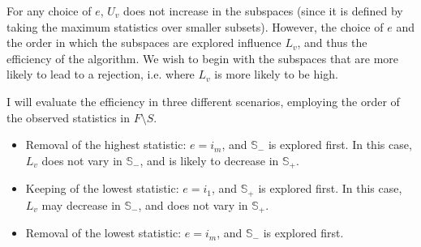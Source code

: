\documentclass[11pt,a4paper,openright,twoside]{article}
\begin{document}
For any choice of $e$, $U_v$ does not increase in the subspaces (since it is defined by taking the maximum statistics over smaller subsets). However, the choice of $e$ and the order in which the subspaces are explored influence $L_v$, and thus the efficiency of the algorithm. We wish to begin with the subspaces that are more likely to lead to a rejection, i.e. where $L_v$ is more likely to be high.

I will evaluate the efficiency in three different scenarios, employing the order of the observed statistics in $F\setminus S$.
\begin{itemize}
\item Removal of the highest statistic: $e=i_m$, and $\mathbb{S}_{-}$ is explored first. In this case, $L_v$ does not vary in $\mathbb{S}_{-}$, and is likely to decrease in $\mathbb{S}_{+}$.
\item Keeping of the lowest statistic: $e=i_1$, and $\mathbb{S}_{+}$ is explored first. In this case, $L_v$ may decrease in $\mathbb{S}_{-}$, and does not vary in $\mathbb{S}_{+}$.
\item Removal of the lowest statistic: $e=i_m$, and $\mathbb{S}_{-}$ is explored first.
\end{itemize}
\end{document}
